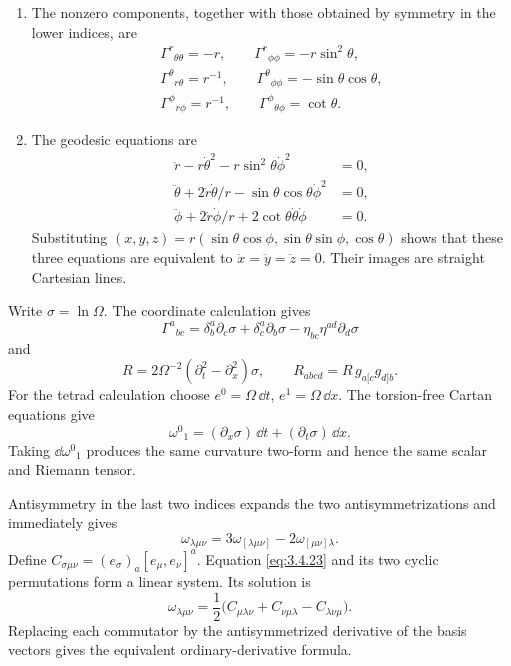 \begin{enumerate}[leftmargin=2.8em,itemsep=1.2em]
\begin{enumerate}[label=\alph*),leftmargin=2em]
\item The nonzero components, together with those obtained by symmetry in the
lower indices, are
\[
 \begin{gathered}
 \Gamma^r{}_{\theta\theta}=-r,\qquad
 \Gamma^r{}_{\phi\phi}=-r\sin^2\theta,\\
 \Gamma^\theta{}_{r\theta}=r^{-1},\qquad
 \Gamma^\theta{}_{\phi\phi}=-\sin\theta\cos\theta,\\
 \Gamma^\phi{}_{r\phi}=r^{-1},\qquad
 \Gamma^\phi{}_{\theta\phi}=\cot\theta.
 \end{gathered}
\]

\item The geodesic equations are
\[
 \begin{aligned}
 \ddot r-r\dot\theta^2-r\sin^2\theta\dot\phi^2&=0,\\
 \ddot\theta+2\dot r\dot\theta/r-
 \sin\theta\cos\theta\dot\phi^2&=0,\\
 \ddot\phi+2\dot r\dot\phi/r+2\cot\theta\dot\theta\dot\phi&=0.
 \end{aligned}
\]
Substituting
\((x,y,z)=r(\sin\theta\cos\phi,\sin\theta\sin\phi,\cos\theta)\)
shows that these three equations are equivalent to
\(\ddot x=\ddot y=\ddot z=0\).  Their images are straight Cartesian lines.
\end{enumerate}

Write \(\sigma=\ln\Omega\).  The coordinate calculation gives
\[
 \Gamma^a{}_{bc}=\delta^a_b\partial_c\sigma+
 \delta^a_c\partial_b\sigma-\eta_{bc}\eta^{ad}\partial_d\sigma
\]
and
\[
 R=2\Omega^{-2}(\partial_t^2-\partial_x^2)\sigma,
 \qquad R_{abcd}=R\,g_{a[c}g_{d]b}.
\]
For the tetrad calculation choose
\(e^0=\Omega\,\dd t\), \(e^1=\Omega\,\dd x\).  The torsion-free Cartan
equations give
\[
 \omega^0{}_1=(\partial_x\sigma)\,\dd t+(\partial_t\sigma)\,\dd x.
\]
Taking \(\dd\omega^0{}_1\) produces the same curvature two-form and hence
the same scalar and Riemann tensor.

Antisymmetry in the last two indices expands the two antisymmetrizations and
immediately gives
\[
 \omega_{\lambda\mu\nu}=3\omega_{[\lambda\mu\nu]}
 -2\omega_{[\mu\nu]\lambda}.
\]
Define
\(C_{\sigma\mu\nu}=(e_\sigma)_a[e_\mu,e_\nu]^a\).  Equation
\eqref{eq:3.4.23} and its two cyclic permutations form a linear system.  Its
solution is
\[
 \boxed{\quad
 \omega_{\lambda\mu\nu}
 =\frac12\bigl(C_{\mu\lambda\nu}+C_{\nu\mu\lambda}
 -C_{\lambda\nu\mu}\bigr).
 \quad}
\]
Replacing each commutator by the antisymmetrized derivative of the basis
vectors gives the equivalent ordinary-derivative formula.
\end{enumerate}
